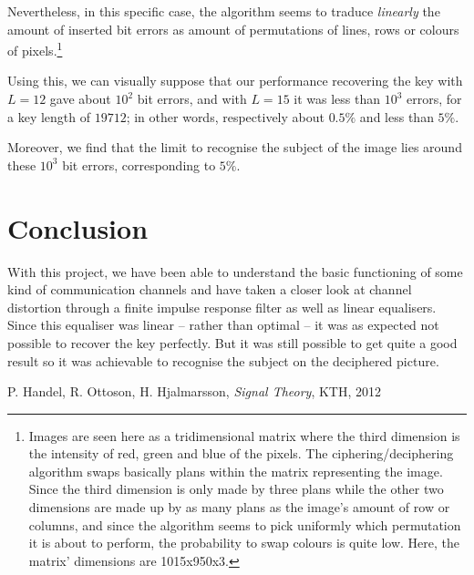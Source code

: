 \documentclass[twocolumn, 12pt]{IEEEtran}
\begin{document}
Nevertheless, in this specific case, the algorithm seems to traduce \textit{linearly} the amount of inserted bit errors as amount of permutations of lines, rows or colours of pixels.\footnote{Images are seen here as a tridimensional matrix where the third dimension is the intensity of red, green and blue of the pixels. The ciphering/deciphering algorithm swaps basically plans within the matrix representing the image. Since the third dimension is only made by three plans while the other two dimensions are made up by as many plans as the image's amount of row or columns, and since the algorithm seems to pick uniformly which permutation it is about to perform, the probability to swap colours is quite low. Here, the matrix' dimensions are 1015x950x3.}

Using this, we can visually suppose that our performance recovering the key with $L=12$ gave about $10^2$ bit errors, and with $L=15$ it was less than $10^3$ errors, for a key length of ${19712}$; in other words, respectively about $0.5\%$ and less than $5\%$.

Moreover, we find that the limit to recognise the subject of the image lies around these $10^{3}$ bit errors, corresponding to $5\%$. 


\section{Conclusion}

With this project, we have been able to understand the basic functioning of some kind of communication channels and have taken a closer look at channel distortion through a finite impulse response filter as well as linear equalisers. Since this equaliser was linear -- rather than optimal -- it was as expected not possible to recover the key perfectly. But it was still possible to get quite a good result so it was achievable to recognise the subject on the deciphered picture.



\begin{thebibliography}{1}

P. Handel, R. Ottoson, H. Hjalmarsson, \emph{Signal Theory}, KTH, 2012

\end{thebibliography}

\balance
\end{document}
